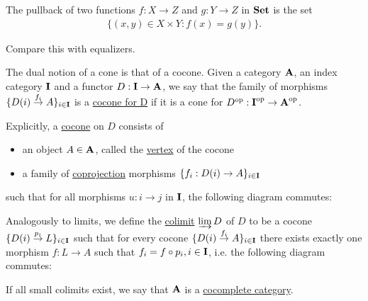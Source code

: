 \begin{example}\label{ex:categorical_pullback/set}
  The pullback of two functions $f: X \to Z$ and $g: Y \to Z$ in $\operatorname{\mathbf{Set}}$ is the set
  \begin{align*}
    \{ (x, y) \in X \times Y \colon f(x) = g(y) \}.
  \end{align*}

  Compare this with equalizers.
\end{example}

\begin{definition}\label{def:categorical_cocone}\cite[definition 5.2.1]{Leinster2014}
  The dual notion of a cone is that of a cocone. Given a category $\operatorname{\mathbf{A}}$, an index category $\operatorname{\mathbf{I}}$ and a functor $D: \operatorname{\mathbf{I}} \to \operatorname{\mathbf{A}}$, we say that the family of morphisms $\{ D(i) \overset {f_i} \to A \}_{i \in \operatorname{\mathbf{I}}}$ is a \uline{cocone for D} if it is a cone for $D^{\operatorname{op}}: \operatorname{\mathbf{I}}^{\operatorname{op}} \to \operatorname{\mathbf{A}}^{\operatorname{op}}$.

  Explicitly, a \uline{cocone} on $D$ consists of
  \begin{itemize}
    \item an object $A \in \operatorname{\mathbf{A}}$, called the \uline{vertex} of the cocone
    \item a family of \uline{coprojection} morphisms $\{ f_i: D(i) \to A \}_{i \in \operatorname{\mathbf{I}}}$
  \end{itemize}
  such that for all morphisms $u: i \to j$ in $\operatorname{\mathbf{I}}$, the following diagram commutes:
  \begin{center}
  \end{center}
\end{definition}

\begin{definition}\label{def:categorical_colimit}\cite[definition 5.1.19(b)]{Leinster2014}
  Analogously to limits, we define the \uline{colimit} $\varinjlim D$ of $D$ to be a cocone $\{ D(i) \overset {p_i} \to L \}_{i \in \operatorname{\mathbf{I}}}$ such that for every cocone $\{ D(i) \overset {f_i} \to A \}_{i \in \operatorname{\mathbf{I}}}$ there exists exactly one morphism $f: L \to A$ such that $f_i = f \circ p_i, i \in \operatorname{\mathbf{I}}$, i.e. the following diagram commutes:
  \begin{center}
  \end{center}

  If all small colimits exist, we say that $\operatorname{\mathbf{A}}$ is a \uline{cocomplete category}.
\end{definition}

